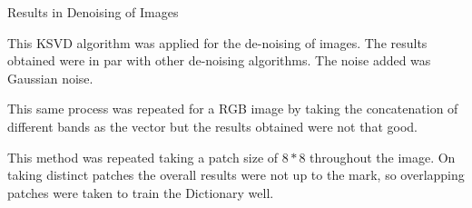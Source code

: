 \documentclass[a4paper, 15pt]{article}
\begin{document}
	\newpage
	\begin{center}
		{\fontsize{20}{30}\selectfont Results in Denoising of Images}\
	\end{center}
	\par
	This KSVD algorithm was applied for the de-noising of images. The results obtained were in par with other de-noising algorithms. The noise added was Gaussian noise. 
	\par
	\par
	This same process was repeated for a RGB image by taking the concatenation of different bands as the vector but the results obtained were not that good. 
	\par
	\par
	This method was repeated taking a patch size of $8*8$ throughout the image. On taking distinct patches the overall results were not up to the mark, so overlapping patches were taken to train the Dictionary well. 
	\par
\end{document}
